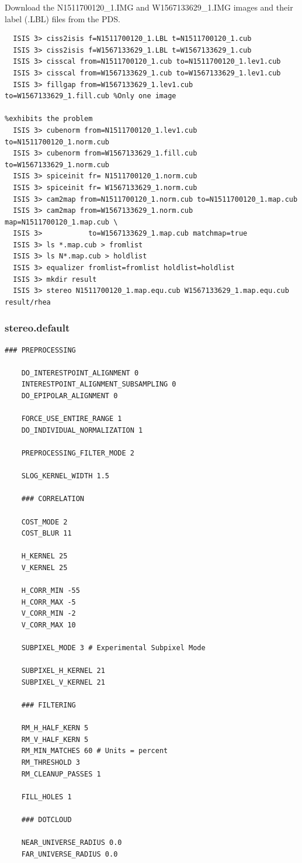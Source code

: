 Download the N1511700120\_1.IMG and W1567133629\_1.IMG images and their label (.LBL) files from the \ac{PDS}.
\begin{verbatim}
  ISIS 3> ciss2isis f=N1511700120_1.LBL t=N1511700120_1.cub
  ISIS 3> ciss2isis f=W1567133629_1.LBL t=W1567133629_1.cub
  ISIS 3> cisscal from=N1511700120_1.cub to=N1511700120_1.lev1.cub
  ISIS 3> cisscal from=W1567133629_1.cub to=W1567133629_1.lev1.cub
  ISIS 3> fillgap from=W1567133629_1.lev1.cub to=W1567133629_1.fill.cub %Only one image
                                                                        %exhibits the problem
  ISIS 3> cubenorm from=N1511700120_1.lev1.cub to=N1511700120_1.norm.cub
  ISIS 3> cubenorm from=W1567133629_1.fill.cub to=W1567133629_1.norm.cub
  ISIS 3> spiceinit fr= N1511700120_1.norm.cub
  ISIS 3> spiceinit fr= W1567133629_1.norm.cub
  ISIS 3> cam2map from=N1511700120_1.norm.cub to=N1511700120_1.map.cub
  ISIS 3> cam2map from=W1567133629_1.norm.cub map=N1511700120_1.map.cub \
  ISIS 3>           to=W1567133629_1.map.cub matchmap=true
  ISIS 3> ls *.map.cub > fromlist
  ISIS 3> ls N*.map.cub > holdlist
  ISIS 3> equalizer fromlist=fromlist holdlist=holdlist
  ISIS 3> mkdir result
  ISIS 3> stereo N1511700120_1.map.equ.cub W1567133629_1.map.equ.cub result/rhea
\end{verbatim}

\subsubsection*{stereo.default}

\begin{center}\begin{minipage}{5.5in}
\begin{Verbatim}[frame=single,fontsize=\small,label=stereo.default for Cassini ISS]
    ### PREPROCESSING

    DO_INTERESTPOINT_ALIGNMENT 0
    INTERESTPOINT_ALIGNMENT_SUBSAMPLING 0
    DO_EPIPOLAR_ALIGNMENT 0

    FORCE_USE_ENTIRE_RANGE 1
    DO_INDIVIDUAL_NORMALIZATION 1

    PREPROCESSING_FILTER_MODE 2

    SLOG_KERNEL_WIDTH 1.5

    ### CORRELATION

    COST_MODE 2
    COST_BLUR 11

    H_KERNEL 25
    V_KERNEL 25

    H_CORR_MIN -55
    H_CORR_MAX -5
    V_CORR_MIN -2
    V_CORR_MAX 10

    SUBPIXEL_MODE 3 # Experimental Subpixel Mode

    SUBPIXEL_H_KERNEL 21
    SUBPIXEL_V_KERNEL 21

    ### FILTERING

    RM_H_HALF_KERN 5
    RM_V_HALF_KERN 5
    RM_MIN_MATCHES 60 # Units = percent
    RM_THRESHOLD 3
    RM_CLEANUP_PASSES 1

    FILL_HOLES 1

    ### DOTCLOUD

    NEAR_UNIVERSE_RADIUS 0.0
    FAR_UNIVERSE_RADIUS 0.0
\end{Verbatim}
\end{minipage}\end{center}
